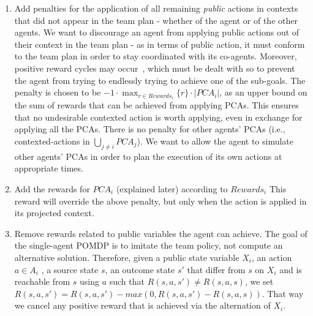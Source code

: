 \documentclass[letterpaper]{article} %
\theoremstyle{definition}
\newcommand{\eliran}[1]{\textbf{[\color{red}ELIRAN:#1]}}
\newcommand{\ronen}[1]{\textbf{[\color{blue}RONEN:#1]}}
\newcommand{\pcact}[1]{{\mathit{PCA}_#1}}
\begin{document}
\begin{enumerate}
\item Add penalties for the application of all remaining \emph{public} actions in contexts that did not appear in the team plan - whether of the agent or of the other agents. We want to discourage an agent from applying public actions out of their context
in the team plan - as in terms of public action, it must conform to the team plan in order to stay coordinated with its co-agents. Moreover, positive reward cycles may occur~\cite{RLCYCLES}, which must be dealt with so to prevent the agent from trying to endlessly trying to achieve one of the sub-goals. The penalty is chosen to be $-1\cdot\max_{r\in Rewards_i}\{r\} \cdot|\pcact{i}|$, as an upper bound on the sum of rewards that can be achieved from applying PCAs. This ensures that no undesirable contexted action is worth applying, even in exchange for applying all the PCAs. There is no penalty for other agents' PCAs
(i.e., contexted-actions in $\bigcup_{j\neq i} \pcact{j}$). We want
to allow the agent to simulate other agents' PCAs in order to plan the execution of its own actions at appropriate times.
\item Add the rewards for $\pcact{i}$ (explained later) according to $Rewards_i$
This reward will override the above penalty, but only when the action is applied in its projected context.
\item 
Remove rewards related to public variables the agent
can achieve. The goal of the single-agent POMDP is to imitate the team policy, not compute an alternative solution.
Therefore, given a public state variable $X_i$, an action $a \in A_i$ , a source state $s$, an outcome state $s'$ that differ from $s$ on $X_i$ and is reachable from $s$ using $a$ such that $R(s, a, s')\neq R(s, a, s)$, we set $R(s,a,s') = R(s,a,s') - \textit{max}\left(0, R(s,a,s') - R(s,a,s)\right)$. That way we cancel any positive reward that is achieved via the alternation of $X_i$.

\end{enumerate}
\end{document}
